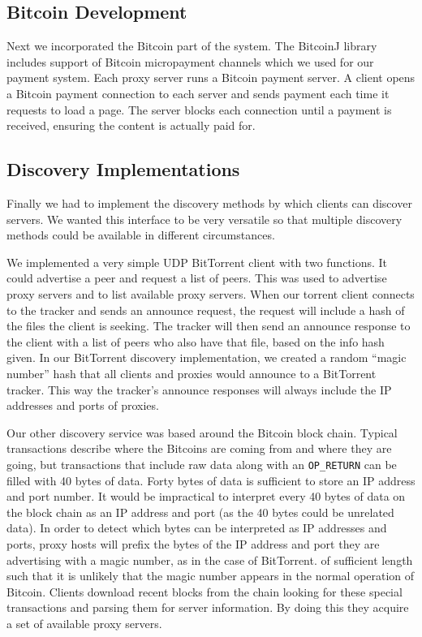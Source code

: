 \subsection{Bitcoin Development}
Next we incorporated the Bitcoin part of the system. The BitcoinJ library includes support of Bitcoin micropayment channels which we used for our payment system. Each proxy server runs a Bitcoin payment server. A client opens a Bitcoin payment connection to each server and sends payment each time it requests to load a page. The server blocks each connection until a payment is received, ensuring the content is actually paid for.

\subsection{Discovery Implementations}
Finally we had to implement the discovery methods by which clients can discover servers. We wanted this interface to be very versatile so that multiple discovery methods could be available in different circumstances.

We implemented a very simple UDP BitTorrent client with two functions. It could advertise a peer and request a list of peers. This was used to advertise proxy servers and to list available proxy servers. When our torrent client connects to the tracker and sends an announce request, the request will include a hash of the files the client is seeking. The tracker will then send an announce response to the client with a list of peers who also have that file, based on the info hash given. In our BitTorrent discovery implementation, we created a random ``magic number'' hash that all clients and proxies would announce to a BitTorrent tracker. This way the tracker's announce responses will always include the IP addresses and ports of proxies.

Our other discovery service was based around the Bitcoin block chain. Typical transactions describe where the Bitcoins are coming from and where they are going, but transactions that include raw data along with an \texttt{OP\_RETURN} can be filled with 40 bytes of data. Forty bytes of data is sufficient to store an IP address and port number. It would be impractical to interpret every 40 bytes of data on the block chain as an IP address and port (as the 40 bytes could be unrelated data). In order to detect which bytes can be interpreted as IP addresses and ports, proxy hosts will prefix the bytes of the IP address and port they are advertising with a magic number, as in the case of BitTorrent. of sufficient length such that it is unlikely that the magic number appears in the normal operation of Bitcoin. Clients download recent blocks from the chain looking for these special transactions and parsing them for server information. By doing this they acquire a set of available proxy servers.
